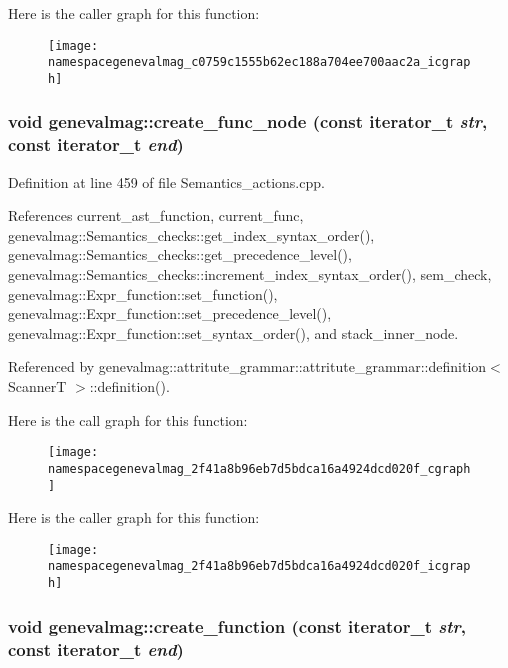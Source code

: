 Here is the caller graph for this function:\nopagebreak
\begin{figure}[H]
\begin{center}
\leavevmode
\texttt{[image: namespacegenevalmag\_c0759c1555b62ec188a704ee700aac2a\_icgraph]}
\end{center}
\end{figure}
\hypertarget{namespacegenevalmag_2f41a8b96eb7d5bdca16a4924dcd020f}{
\subsubsection[{create\_\-func\_\-node}]{\setlength{\rightskip}{0pt plus 5cm}void genevalmag::create\_\-func\_\-node (const iterator\_\-t {\em str}, \/  const iterator\_\-t {\em end})}}
\label{namespacegenevalmag_2f41a8b96eb7d5bdca16a4924dcd020f}




Definition at line 459 of file Semantics\_\-actions.cpp.

References current\_\-ast\_\-function, current\_\-func, genevalmag::Semantics\_\-checks::get\_\-index\_\-syntax\_\-order(), genevalmag::Semantics\_\-checks::get\_\-precedence\_\-level(), genevalmag::Semantics\_\-checks::increment\_\-index\_\-syntax\_\-order(), sem\_\-check, genevalmag::Expr\_\-function::set\_\-function(), genevalmag::Expr\_\-function::set\_\-precedence\_\-level(), genevalmag::Expr\_\-function::set\_\-syntax\_\-order(), and stack\_\-inner\_\-node.

Referenced by genevalmag::attritute\_\-grammar::attritute\_\-grammar::definition$<$ ScannerT $>$::definition().

Here is the call graph for this function:\nopagebreak
\begin{figure}[H]
\begin{center}
\leavevmode
\texttt{[image: namespacegenevalmag\_2f41a8b96eb7d5bdca16a4924dcd020f\_cgraph]}
\end{center}
\end{figure}


Here is the caller graph for this function:\nopagebreak
\begin{figure}[H]
\begin{center}
\leavevmode
\texttt{[image: namespacegenevalmag\_2f41a8b96eb7d5bdca16a4924dcd020f\_icgraph]}
\end{center}
\end{figure}
\hypertarget{namespacegenevalmag_166358b221cbf34ec512b137326d6c44}{
\subsubsection[{create\_\-function}]{\setlength{\rightskip}{0pt plus 5cm}void genevalmag::create\_\-function (const iterator\_\-t {\em str}, \/  const iterator\_\-t {\em end})}}
\label{namespacegenevalmag_166358b221cbf34ec512b137326d6c44}




